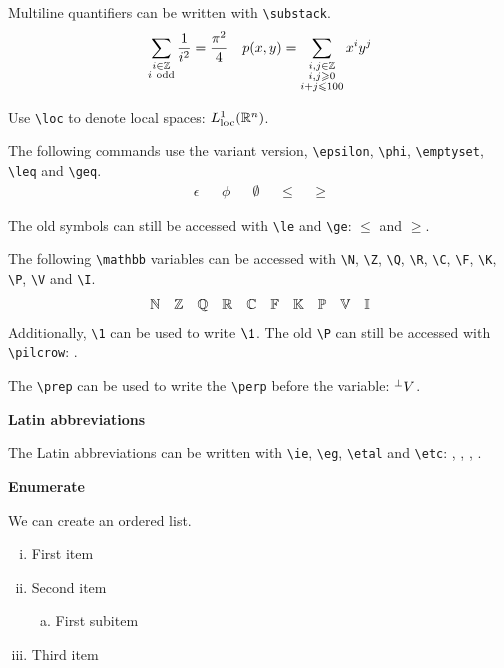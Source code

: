 \documentclass{myassignment}
\begin{document}
Multiline quantifiers can be written with \texttt{\textbackslash substack}.
\begin{align*}
    \sum_{\substack{i \in \mathbb{Z} \\ i~\text{odd}}} \frac{1}{i^2} = \frac{\pi^2}{4} && p(x, y) = \sum_{\substack{i, j \in \mathbb{Z} \\ i, j \geqslant 0 \\ i + j \leqslant 100}} x^i y^j
\end{align*}

Use \texttt{\textbackslash loc} to denote local spaces: $L_{\mathrm{loc}}^1(\mathbb{R}^n)$.

The following commands use the variant version, \texttt{\textbackslash epsilon}, \texttt{\textbackslash phi}, \texttt{\textbackslash emptyset}, \texttt{\textbackslash leq} and \texttt{\textbackslash geq}.
\begin{align*}
    \epsilon && \phi && \emptyset && \leq && \geq
\end{align*}

The old symbols can still be accessed with \texttt{\textbackslash le} and \texttt{\textbackslash ge}: $\le$ and $\ge$.

The following \texttt{\textbackslash mathbb} variables can be accessed with \texttt{\textbackslash N}, \texttt{\textbackslash Z}, \texttt{\textbackslash Q}, \texttt{\textbackslash R}, \texttt{\textbackslash C}, \texttt{\textbackslash F}, \texttt{\textbackslash K}, \texttt{\textbackslash P}, \texttt{\textbackslash V} and \texttt{\textbackslash I}.
\begin{align*}
    \mathbb{N} && \mathbb{Z} && \mathbb{Q} && \mathbb{R} && \mathbb{C} && \mathbb{F} && \mathbb{K} && \mathbb{P} && \mathbb{V} && \mathbb{I}
\end{align*}
Additionally, \texttt{\textbackslash 1} can be used to write $\1$. The old \texttt{\textbackslash P} can still be accessed with \texttt{\textbackslash pilcrow}: \pilcrow.

The \texttt{\textbackslash prep} can be used to write the \texttt{\textbackslash perp} before the variable: ${}^\perp V$.

\textbf{Latin abbreviations}

The Latin abbreviations can be written with \texttt{\textbackslash ie}, \texttt{\textbackslash eg}, \texttt{\textbackslash etal} and \texttt{\textbackslash etc}: \ie, \eg, \etal, \etc.

\newpage

\textbf{Enumerate}

We can create an ordered list.

\begin{enumerate}[i.]
    \item First item
    \item Second item
    \begin{enumerate}[(a)]
        \item First subitem
    \end{enumerate}
    \item Third item
\end{enumerate}
\end{document}
